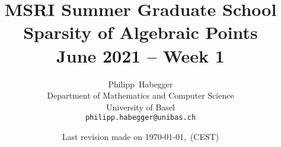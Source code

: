 \documentclass[oneside]{scrbook}
\begin{document}
\title{MSRI Summer Graduate School \\ Sparsity of Algebraic Points \\
  June 2021 -- Week 1}
\author{Philipp~Habegger \\ Department of Mathematics and Computer
  Science \\ University of Basel \\ \texttt{philipp.habegger@unibas.ch}}
\date{Last revision made on \today, \currenttime \,(CEST)}



\maketitle
\tableofcontents

\setcounter{chapter}{-1}















\vfill\hfill\texttt{}
\end{document}
